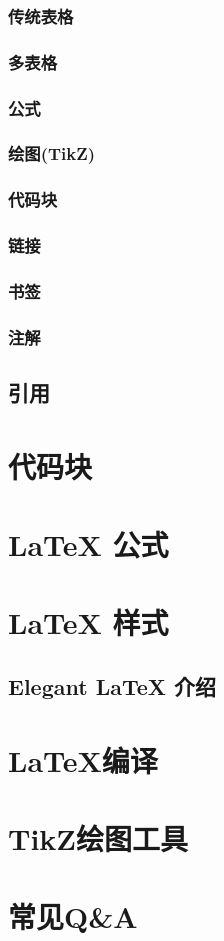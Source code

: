 \documentclass[cn,10pt,math=newtx,citestyle=gb7714-2015,bibstyle=gb7714-2015]{elegantbook}
\begin{document}
    \subsection {传统表格}

    \subsection {多表格}
    
    \subsection {公式}

    \subsection {绘图(TikZ)}

    \subsection {代码块}

    \subsection {链接}

    \subsection {书签}

    \subsection {注解}

    \section {引用}
    

    

    \chapter{代码块}

    \chapter{\LaTeX{} 公式}

    \chapter{\LaTeX{} 样式}

    \section {Elegant \LaTeX{} 介绍}

    \chapter{\LaTeX{}编译}

    \chapter{TikZ绘图工具}

    \chapter{常见Q\&A}
\end{document}
